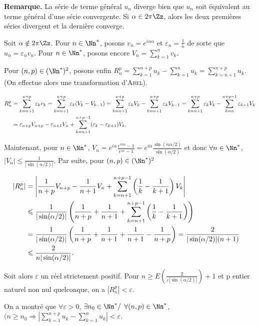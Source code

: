 {{\textbf{Remarque.} La série de terme général $u_n$ diverge bien que $u_n$ soit équivalent au terme général d'une série convergente.
Si $\alpha\in2\pi\Zz$, alors les deux premières séries divergent et la dernière converge.

Soit $\alpha\notin2\pi\Zz$. Pour $n\in\Nn^*$, posons $v_n=e^{in\alpha}$ et $\varepsilon_n=\frac{1}{n}$ de sorte que $u_n=\varepsilon_nv_n$. Pour $n\in\Nn^*$, posons encore $V_n =\sum_{k=1}^{n}v_k$.

Pour $(n ,p)\in(\Nn^*)^2$, posons enfin $R_n^p=\sum_{k=1}^{n+p}u_k-\sum_{k=1}^{n}u_k=\sum_{k=n+1}^{n+p}u_k$. (On effectue alors une transformation d'\textsc{Abel}).

\begin{align*}\ensuremath
R_n^p&=\sum_{k=n+1}^{n+p}\varepsilon_kv_k =\sum_{k=n+1}^{n+p}\varepsilon_k(V_k-V_{k-1}) =\sum_{k=n+1}^{n+p}\varepsilon_kV_k-\sum_{k=n+1}^{n+p}\varepsilon_kV_{k-1} =\sum_{k=n+1}^{n+p}\varepsilon_kV_k-\sum_{k=n}^{n+p-1}\varepsilon_{k+1}V_{k}\\
 &=\varepsilon_{n+p}V_{n+p}-\varepsilon_{n+1}V_n+ \sum_{k=n+1}^{n+p-1}(\varepsilon_k-\varepsilon_{k+1})V_k.
\end{align*}

Maintenant, pour $n\in\Nn^*$, $V_n=e^{i\alpha}\frac{e^{in\alpha}-1}{e^{i\alpha}-1}=e^{i\alpha}\frac{\sin(n\alpha/2)}{\sin(\alpha/2)}$  et donc $\forall n\in\Nn^*$, $|V_n|\leqslant\frac{1}{|\sin(\alpha/2)|}$. Par suite, pour $(n,p)\in(\Nn^*)^2$

\begin{align*}\ensuremath
|R_n^p|&=\left|\frac{1}{n+p}V_{n+p}-\frac{1}{n+1}V_n+ \sum_{k=n+1}^{n+p-1}\left(\frac{1}{k}-\frac{1}{k+1}\right)V_k\right|&\\
 &\leqslant\frac{1}{|\sin(\alpha/2)|}\left(\frac{1}{n+p}+\frac{1}{n+1}+ \sum_{k=n+1}^{n+p-1}\left(\frac{1}{k}-\frac{1}{k+1}\right)\right)\\
 &=\frac{1}{|\sin(\alpha/2)|}\left(\frac{1}{n+p}+\frac{1}{n+1}+\frac{1}{n+1}-\frac{1}{n+p}\right)=\frac{2}{|\sin(\alpha/2)|(n+1)}\\
  &\leqslant\frac{2}{n|\sin(\alpha/2)|}.
\end{align*}

Soit alors $\varepsilon$ un réel strictement positif. Pour $n\geqslant E\left(\frac{2}{\varepsilon|\sin(\alpha/2)|}\right)+ 1$ et p entier naturel non nul quelconque, on a $|R_n^p|<\varepsilon$.

On a montré que $\forall\varepsilon>0$, $\exists n_0\in\Nn^*/$ $\forall(n,p)\in\Nn^*$, $(n\geqslant n_0\Rightarrow\left|\sum_{k=1}^{n+p}u_k-\sum_{k=1}^{n}u_k\right|<\varepsilon$.

}}
